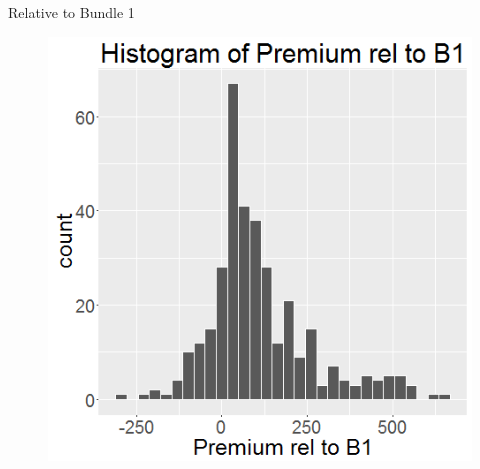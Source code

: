 \documentclass[xcolor=dvipsnames,12pt]{beamer}
\theoremstyle{definition}
\begin{document}
\begin{frame}{Relative to Bundle 1}
\begin{figure}

\graphicspath{ {../../1_relative_to_bundle_1/} }
\includegraphics[scale=0.43]{4_histogram_of_prem_rel_to_bundle_1}
\end{figure}
\end{frame}
\end{document}
